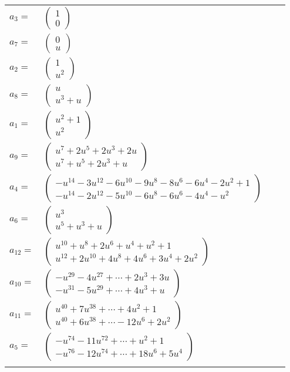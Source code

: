\documentclass[1p]{elsarticle_modified}
\theoremstyle{definition}
\begin{document}
\begin{tabular}{m{7pt} m{180pt} m{7pt} m{180pt} }
\flushright $a_{3}=$&$\begin{pmatrix}1\\0\end{pmatrix}$ \\
\flushright $a_{7}=$&$\begin{pmatrix}0\\u\end{pmatrix}$ \\
\flushright $a_{2}=$&$\begin{pmatrix}1\\u^2\end{pmatrix}$ \\
\flushright $a_{8}=$&$\begin{pmatrix}u\\u^3+u\end{pmatrix}$ \\
\flushright $a_{1}=$&$\begin{pmatrix}u^2+1\\u^2\end{pmatrix}$ \\
\flushright $a_{9}=$&$\begin{pmatrix}u^7+2 u^5+2 u^3+2 u\\u^7+u^5+2 u^3+u\end{pmatrix}$ \\
\flushright $a_{4}=$&$\begin{pmatrix}- u^{14}-3 u^{12}-6 u^{10}-9 u^8-8 u^6-6 u^4-2 u^2+1\\- u^{14}-2 u^{12}-5 u^{10}-6 u^8-6 u^6-4 u^4- u^2\end{pmatrix}$ \\
\flushright $a_{6}=$&$\begin{pmatrix}u^3\\u^5+u^3+u\end{pmatrix}$ \\
\flushright $a_{12}=$&$\begin{pmatrix}u^{10}+u^8+2 u^6+u^4+u^2+1\\u^{12}+2 u^{10}+4 u^8+4 u^6+3 u^4+2 u^2\end{pmatrix}$ \\
\flushright $a_{10}=$&$\begin{pmatrix}- u^{29}-4 u^{27}+\cdots+2 u^3+3 u\\- u^{31}-5 u^{29}+\cdots+4 u^3+u\end{pmatrix}$ \\
\flushright $a_{11}=$&$\begin{pmatrix}u^{40}+7 u^{38}+\cdots+4 u^2+1\\u^{40}+6 u^{38}+\cdots-12 u^6+2 u^2\end{pmatrix}$ \\
\flushright $a_{5}=$&$\begin{pmatrix}- u^{74}-11 u^{72}+\cdots+u^2+1\\- u^{76}-12 u^{74}+\cdots+18 u^6+5 u^4\end{pmatrix}$\\&\end{tabular}
\end{document}
